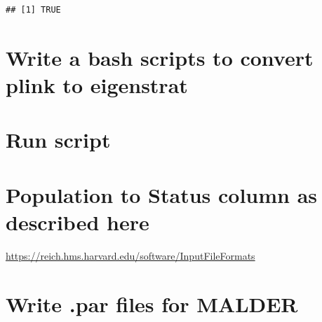 \documentclass[
]{article}
\begin{document}
\begin{verbatim}
## [1] TRUE
\end{verbatim}

\section{Write a bash scripts to convert plink to
eigenstrat}\label{write-a-bash-scripts-to-convert-plink-to-eigenstrat-1}

\section{Run script}\label{run-script-1}

\section{Population to Status column as described
here}\label{population-to-status-column-as-described-here}

\url{https://reich.hms.harvard.edu/software/InputFileFormats}

\section{Write .par files for MALDER}\label{write-.par-files-for-malder}
\end{document}
